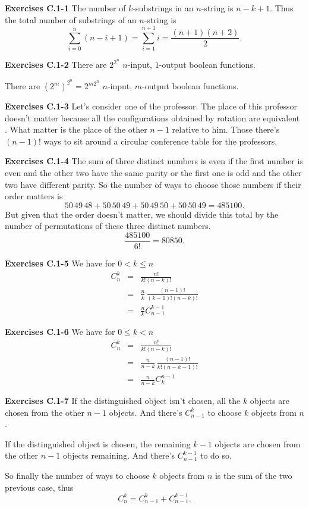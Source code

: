 \documentclass[a4paper,12pt]{article}
\newcommand{\newpar}[1]
{\bigskip \noindent \textbf{Exercises #1} \newline}
\begin{document}
\newpar{C.1-1}
The number of $k$-substrings in an $n$-string is $n-k+1$.  Thus the
total number of substrings of an $n$-string is
\[ \sum_{i=0}^n (n-i+1) = \sum_{i=1}^{n+1}i = \frac{(n+1)(n+2)}{2}.\]

\newpar{C.1-2}
There are $2^{2^n}$ $n$-input, $1$-output boolean functions.

There are $(2^m)^{2^n} = 2^{m2^n}$ $n$-input, $m$-output boolean
functions.

\newpar{C.1-3}
Let's consider one of the professor.  The place of this professor
doesn't matter because all the configurations obtained by rotation are
equivalent .  What matter is the place of the other $n-1$ relative to
him.  Those there's $(n-1)!$ ways to sit around a circular conference
table for the professors.

\newpar{C.1-4}
The sum of three distinct numbers is even if the first number is even
and the other two have the same parity or the first one is odd and the
other two have different parity.  So the number of ways to choose  those
numbers if their order matters is
\[ 50 \,49\, 48 + 50\, 50\, 49 + 50\, 49\, 50 + 50\, 50\, 49 = 485100.\]
But given that the order doesn't matter, we should divide this total
by the number of permutations of these three distinct numbers.
\[ \frac{485100}{6!} = 80850.\]

\newpar{C.1-5}
We have for $0 < k \le n$
\begin{eqnarray*}
  C_n^k &=& \frac{n!}{k!(n-k)!} \\
  &=& \frac{n}{k}\,\frac{(n-1)!}{(k-1)!(n-k)!} \\
  &=& \frac{n}{k}C_{n-1}^{k-1}
\end{eqnarray*}

\newpar{C.1-6}
We have for $0 \le k < n$
\begin{eqnarray*}
  C_n^k &=& \frac{n!}{k!(n-k)!} \\
  &=& \frac{n}{n-k}\,\frac{(n-1)!}{k!(n-k-1)!} \\
  &=& \frac{n}{n-k}C_k^{n-1}
\end{eqnarray*}

\newpar{C.1-7}
If the distinguished object isn't chosen, all the $k$ objects are
 chosen from the other $n-1$ objects.  And there's $C_{n-1}^k$ to
choose $k$ objects from $n$.

If the distinguished object is chosen,  the remaining $k-1$ objects
are chosen from the other $n-1$ objects remaining.  And there's
$C_{n-1}^{k-1}$ to do so.

So finally the number of ways to choose $k$ objects from $n$ is the
sum of the two previous case, thus
\[ C_n^k = C_{n-1}^k + C_{n-1}^{k-1}.\]
\end{document}
